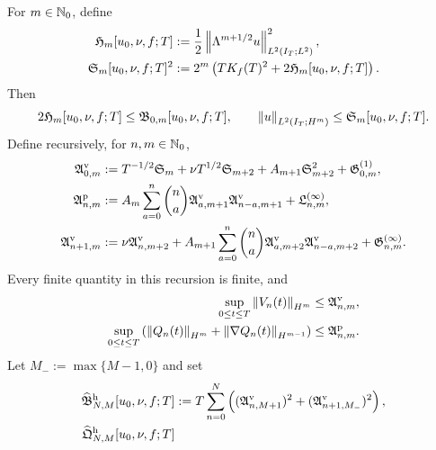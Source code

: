 \begin{proposition}
\label{f:prop:qc-critical-height-row-propagation}
For \(m\in\mathbb N_0\), define
\begin{align}
 \mathfrak H_m[u_0,\nu,f;T]
 &:={}
 \frac12\left\lVert \Lambda^{m+1/2}u\right\rVert_{L^2(I_T;L^2)}^2,
 \label{f:eq:qc-height-producer-coordinate}\\
 \mathfrak S_m[u_0,\nu,f;T]^2
 &:={}
 2^m\left(TK_f(T)^2+2\mathfrak H_m[u_0,\nu,f;T]\right).
 \label{f:eq:qc-spatial-row-from-height}
\end{align}
Then
\begin{equation}
 2\mathfrak H_m[u_0,\nu,f;T]
 \le\mathfrak B_{0,m}[u_0,\nu,f;T],
 \qquad
 \left\lVert u\right\rVert_{L^2(I_T;H^m)}\le\mathfrak S_m[u_0,\nu,f;T].
 \label{f:eq:qc-height-spatial-bounds}
\end{equation}
Define recursively, for \(n,m\in\mathbb N_0\),
\begin{align}
 \mathfrak A^{\rm v}_{0,m}
 &:={}
 T^{-1/2}\mathfrak S_m
 +\nu T^{1/2}\mathfrak S_{m+2}
 +A_{m+1}\mathfrak S_{m+2}^2
 +\mathfrak G^{(1)}_{0,m},
 \label{f:eq:qc-height-base-pointwise-majorant}\\
 \mathfrak A^{\rm p}_{n,m}
 &:={}
 A_m\sum_{a=0}^{n}\binom na
 \mathfrak A^{\rm v}_{a,m+1}
 \mathfrak A^{\rm v}_{n-a,m+1}
 +\mathfrak L^{(\infty)}_{n,m},
 \label{f:eq:qc-height-pressure-majorant}\\
 \mathfrak A^{\rm v}_{n+1,m}
 &:={}
 \nu\mathfrak A^{\rm v}_{n,m+2}
 +A_{m+1}\sum_{a=0}^{n}\binom na
 \mathfrak A^{\rm v}_{a,m+2}
 \mathfrak A^{\rm v}_{n-a,m+2}
 +\mathfrak G^{(\infty)}_{n,m}.
 \label{f:eq:qc-height-temporal-majorant}
\end{align}
Every finite quantity in this recursion is finite, and
\begin{align}
 \sup_{0\le t\le T}\left\lVert V_n(t)\right\rVert_{H^m}
 &\le\mathfrak A^{\rm v}_{n,m},
 \label{f:eq:qc-height-temporal-row-bound}\\
 \sup_{0\le t\le T}
 \left(\left\lVert Q_n(t)\right\rVert_{H^m}
 +\left\lVert \nabla Q_n(t)\right\rVert_{H^{m-1}}\right)
 &\le\mathfrak A^{\rm p}_{n,m}.
 \label{f:eq:qc-height-pressure-row-bound}
\end{align}
Let \(M_-:=\max\{M-1,0\}\) and set
\begin{align}
 \widehat{\mathfrak B}_{N,M}^{\rm h}[u_0,\nu,f;T]
 &:={}
 T\sum_{n=0}^{N}\left(
 (\mathfrak A^{\rm v}_{n,M+1})^2
 +(\mathfrak A^{\rm v}_{n+1,M_-})^2
 \right),
 \label{f:eq:qc-height-reconstructed-rectangle}\\
 \widehat{\mathfrak Q}_{N,M}^{\rm h}[u_0,\nu,f;T]

\end{align}
\end{proposition}
